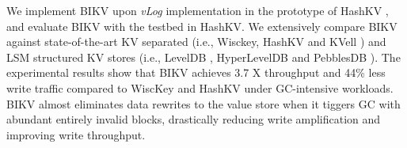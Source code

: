 \documentclass[sigconf]{acmart}
\begin{document}

We implement BIKV upon \textit{vLog} implementation in the prototype of HashKV \cite{HashKV}, and evaluate BIKV with the testbed in HashKV. We extensively compare BIKV against state-of-the-art KV separated (i.e., Wisckey, HashKV and KVell \cite{KVell}) and LSM structured KV stores (i.e., LevelDB \cite{LevelDB}, HyperLevelDB \cite{HyperLevelDB} and PebblesDB \cite{PebblesDB}). The experimental results show that BIKV achieves 3.7 X throughput and 44\% less write traffic compared to WiscKey and HashKV under GC-intensive workloads. BIKV almost eliminates data rewrites to the value store when it tiggers GC with abundant entirely invalid blocks, drastically reducing write amplification and improving write throughput.

\end{document}
